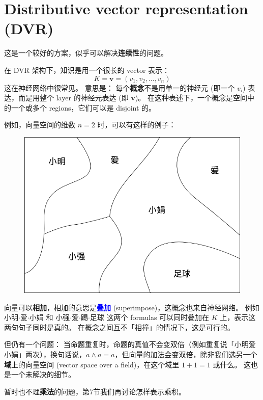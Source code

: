 \documentclass[12pt]{article}
\newcommand{\concept}[1]{\textbf{\textcolor{blue}{#1}}}
\newcommand{\formula}[1]{\textcolor{LogicColor}{#1}}
\begin{document}
\section{Distributive vector representation (DVR)}

这是一个较好的方案，似乎可以解决\textbf{连续性}的问题。

在 DVR 架构下，知识是用一个很长的 vector 表示：
$$ K = \mathbf{v} = (v_1, v_2, ... , v_n) $$
这在神经网络中很常见。  意思是： 每个\textbf{概念}不是用单一的神经元 (即一个 $v_i$) 表达，而是用整个 layer 的神经元表达 (即 $\mathbf{v}$)。 在这种表述下，一个概念是空间中的一个或多个 regions，它们可以是 disjoint 的。

例如，向量空间的维数 $n=2$ 时，可以有这样的例子：
\begin{figure}[H]
\centering
\includegraphics[scale=0.5]{distributive-vector-representation.png}
\end{figure}

向量可以\textbf{相加}，相加的意思是\concept{叠加} (superimpose)，这概念也来自神经网络。 例如 \formula{小明$\cdot$爱$\cdot$小娟} 和 \formula{小强$\cdot$爱$\cdot$踢$\cdot$足球} 这两个 formulas 可以同时叠加在 $K$ 上，表示这两句句子同时是真的。 在概念之间互不「相撞」的情况下，这是可行的。

但仍有一个问题： 当命题重复时，命题的真值不会变双倍（例如重复说「小明爱小娟」两次），换句话说，$a \wedge a = a$，但向量的加法会变双倍，除非我们选另一个\textbf{域}上的向量空间 (vector space over a field)，在这个域里 $ 1 + 1 = 1 $ 或什么。 这也是一个未解决的细节。

暂时也不理\textbf{乘法}的问题，第7节我们再讨论怎样表示乘积。
\end{document}
